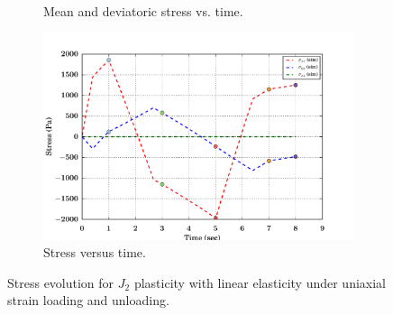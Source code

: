 \begin{figure}[htbp!]
\begin{subfigure}{0.5\textwidth}
    \caption{Mean and deviatoric stress vs. time.}
  \end{subfigure}
  \begin{subfigure}{0.5\textwidth}
    \centering
    \includegraphics[width=\textwidth]{MPMMaterials/FIGS/UniaxialStrainLoadUnloadJ2Lin_sigma_time.pdf}
    \caption{Stress versus time.}
  \end{subfigure}
  \caption{Stress evolution for $J_2$ plasticity with linear elasticity under uniaxial strain
           loading and unloading.}
  \label{fig:J2LinLoadUnload}
\end{figure}

\newpage
